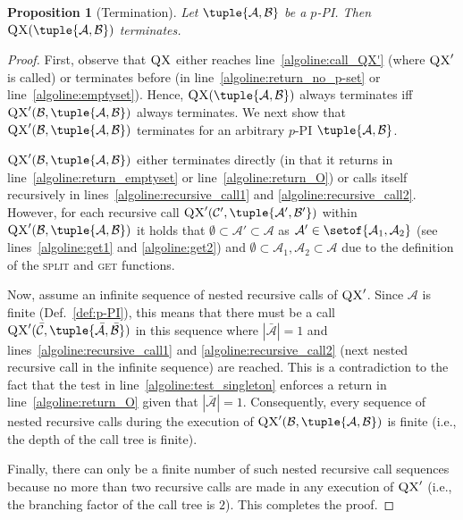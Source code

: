 \documentclass[]{elsarticle}
\newcommand{\scQX}{{\textsc{QX}}}
\newcommand{\mo}{\mathcal{K}}
\newcommand{\ma}{\mathcal{A}}
\newcommand{\mb}{\mathcal{B}}
\newcommand{\mc}{\mathcal{C}}
\newcommand{\ba}{\bar{\ma}}
\newcommand{\bb}{\bar{\mb}}
\newcommand{\bc}{\bar{\mc}}
\newtheorem{proposition}{Proposition}[]{}
\begin{document}
	\begin{proposition}[Termination]\label{prop:termination}
		Let $\tuple{\ma,\mb}$ be a $p$-PI. Then $\scQX(\tuple{\ma,\mb})$ terminates.	
	\end{proposition}
	\begin{proof}
		First, observe that $\scQX$ either reaches line~\ref{algoline:call_QX'} (where $\scQX'$ is called) or terminates before (in line~\ref{algoline:return_no_p-set} or line~\ref{algoline:emptyset}). Hence, $\scQX(\tuple{\ma,\mb})$ always terminates iff $\scQX'(\mb,\tuple{\ma,\mb})$ always terminates. We next show that $\scQX'(\mb,\tuple{\ma,\mb})$ terminates for an arbitrary $p$-PI $\tuple{\ma,\mb}$.
		
		$\scQX'(\mb,\tuple{\ma,\mb})$ either terminates directly (in that it returns in line~\ref{algoline:return_emptyset} or line~\ref{algoline:return_O}) or calls itself recursively in lines~\ref{algoline:recursive_call1} and \ref{algoline:recursive_call2}. 
		However, for each recursive call $\scQX'(\mc',\tuple{\ma',\mb'})$ within $\scQX'(\mb,\tuple{\ma,\mb})$ it holds that $\emptyset \subset \ma' \subset \ma$ as $\ma' \in \setof{\ma_1,\ma_2}$ (see lines~\ref{algoline:get1} and \ref{algoline:get2}) and $\emptyset \subset \ma_1, \ma_2 \subset \ma$ due to the definition of the \textsc{split} and \textsc{get} functions. 
		
		Now, assume an infinite sequence of nested recursive calls of $\scQX'$. Since $\ma$ is finite (Def.~\ref{def:p-PI}), this means that there must be a call $\scQX'(\bc,\tuple{\ba,\bb})$ in this sequence where $|\ba|=1$ and lines~\ref{algoline:recursive_call1} and \ref{algoline:recursive_call2} (next nested recursive call in the infinite sequence) are reached. This is a contradiction to the fact that the test in line~\ref{algoline:test_singleton} enforces a return in line~\ref{algoline:return_O} given that $|\ba|=1$. Consequently, every sequence of nested recursive calls during the execution of $\scQX'(\mb,\tuple{\ma,\mb})$ is finite (i.e., the depth of the call tree is finite).
		
		Finally, there can only be a finite number of such nested recursive call sequences because no more than two recursive calls are made in any execution of $\scQX'$ (i.e., the branching factor of the call tree is $2$). This completes the proof.
	\end{proof}
\end{document}

